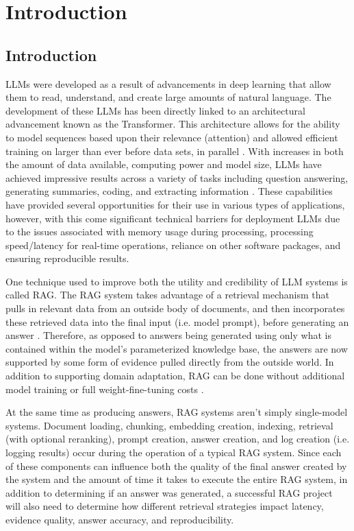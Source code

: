 \chapter{Introduction}

\section{Introduction}
\acfp{LLM} were developed as a result of advancements in deep learning that allow them to read, understand, and create large amounts of natural language. The development of these \acp{LLM} has been directly linked to an architectural advancement known as the Transformer. This architecture allows for the ability to model sequences based upon their relevance (attention) and allowed  efficient training on larger than ever before data sets, in parallel \cite{vaswani2017attention}. With increases in both the amount of data available, computing power and model size, \acp{LLM} have achieved impressive results across a variety of tasks including question answering, generating summaries, coding, and extracting information \cite{brown2020language,kaplan2020scaling}. These capabilities have provided several opportunities for their use in various types of applications, however, with this come significant technical barriers for deployment \acp{LLM} due to the issues associated with memory usage during processing, processing speed/latency for real-time operations, reliance on other software packages, and ensuring reproducible results.

One technique used to improve both the utility and credibility of \acf{LLM} systems is called \acf{RAG}. The \ac{RAG} system takes advantage of a retrieval mechanism that pulls in relevant data from an outside body of documents, and then incorporates these retrieved data into the final input (i.e. model prompt), before generating an answer \cite{lewis2020rag,izacard2021leveraging}. Therefore, as opposed to answers being generated using only what is contained within the model's parameterized knowledge base, the answers are now supported by some form of evidence pulled directly from the outside world. In addition to supporting domain adaptation, \ac{RAG} can be done without additional model training or full weight-fine-tuning costs \cite{borgeaud2022retro}. 

At the same time as producing answers, \ac{RAG} systems aren't simply single-model systems. Document loading, chunking, embedding creation, indexing, retrieval (with optional reranking), prompt creation, answer creation, and log creation (i.e. logging results) occur during the operation of a typical \ac{RAG} system. Since each of these components can influence both the quality of the final answer created by the system and the amount of time it takes to execute the entire \ac{RAG} system, in addition to determining if an answer was generated, a successful \ac{RAG} project will also need to determine how different retrieval strategies impact latency, evidence quality, answer accuracy, and reproducibility.

